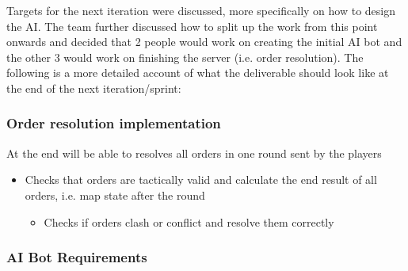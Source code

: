 \documentclass[12pt]{article}
\begin{document}
Targets for the next iteration were discussed, more specifically on
how to design the AI. The team further discussed how to split up the
work from this point onwards and decided that 2 people would work
on creating the initial AI bot and the other 3 would work on finishing
the server (i.e. order resolution). The following is a more detailed
account of what the deliverable should look like at the end of the
next iteration/sprint:


\subsubsection{Order resolution implementation}

At the end will be able to resolves all orders in one round sent by
the players
\begin{itemize}
\item Checks that orders are tactically valid and calculate the end result
of all orders, i.e. map state after the round

\begin{itemize}
\item Checks if orders clash or conflict and resolve them correctly
\end{itemize}
\end{itemize}

\subsubsection{AI Bot Requirements}
\end{document}
